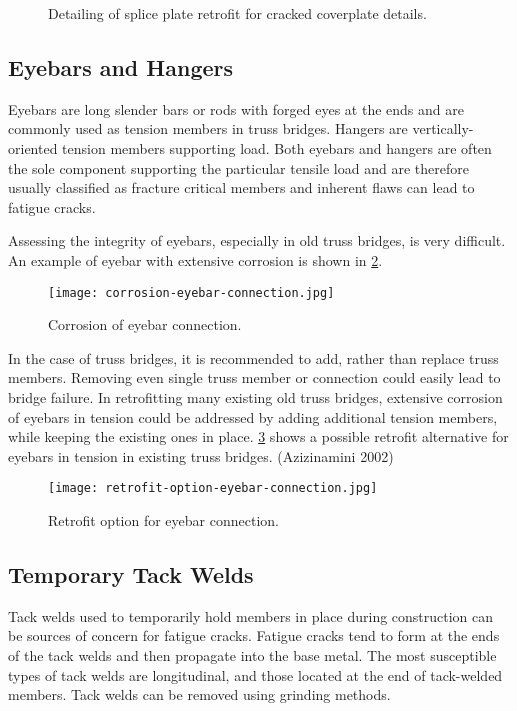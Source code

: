 \begin{figure}
  \caption{Detailing of splice plate retrofit for cracked coverplate details.}
  \label{fig:detail-splice-plate-retrofit-cracked-coverplate}
\end{figure}

\subsection{Eyebars and Hangers}
Eyebars are long slender bars or rods with forged eyes at the ends and are commonly used as tension members in
truss bridges. Hangers are vertically-oriented tension members supporting load. Both eyebars and hangers are often
the sole component supporting the particular tensile load and are therefore usually classified as fracture critical
members and inherent flaws can lead to fatigue cracks.

Assessing the integrity of eyebars, especially in old truss bridges, is very difficult. An example of eyebar with
extensive corrosion is shown in \cref{fig:corrosion-eyebar-connection}.

\begin{figure}
  \texttt{[image: corrosion-eyebar-connection.jpg]}
  \caption{Corrosion of eyebar connection.}
  \label{fig:corrosion-eyebar-connection}
\end{figure}

In the case of truss bridges, it is recommended to add, rather than replace truss members. Removing even single
truss member or connection could easily lead to bridge failure. In retrofitting many existing old truss bridges,
extensive corrosion of eyebars in tension could be addressed by adding additional tension members, while keeping
the existing ones in place. \cref{fig:retrofit-option-eyebar-connection} shows a possible retrofit alternative for eyebars in tension in existing truss
bridges. (Azizinamini 2002)

\begin{figure}
  \texttt{[image: retrofit-option-eyebar-connection.jpg]}
  \caption{Retrofit option for eyebar connection.}
  \label{fig:retrofit-option-eyebar-connection}
\end{figure}

\subsection{Temporary Tack Welds}
Tack welds used to temporarily hold members in place during construction can be sources of concern for fatigue
cracks. Fatigue cracks tend to form at the ends of the tack welds and then propagate into the base metal. The most
susceptible types of tack welds are longitudinal, and those located at the end of tack-welded members. Tack welds
can be removed using grinding methods.


